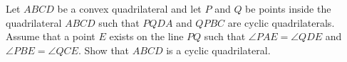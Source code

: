 Let $ABCD$ be a convex quadrilateral and let $P$ and $Q$ be points inside the
quadrilateral $ABCD$ such that $PQDA$ and $QPBC$ are cyclic quadrilaterals.
Assume that a point $E$ exists on the line $PQ$ such that $\angle PAE=\angle QDE$ and
$\angle PBE=\angle QCE$. Show that $ABCD$ is a cyclic quadrilateral.